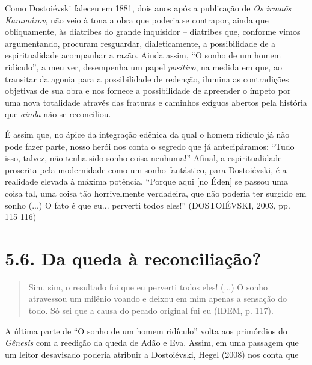 Como Dostoiévski faleceu em 1881, dois anos após a publicação de
\emph{Os irmaõs Karamázov}, não veio à tona a obra que poderia se
contrapor, ainda que obliquamente, às diatribes do grande inquisidor --
diatribes que, conforme vimos argumentando, procuram resguardar,
dialeticamente, a possibilidade de a espiritualidade acompanhar a razão.
Ainda assim, ``O sonho de um homem ridículo'', a meu ver, desempenha um
papel \emph{positivo}, na medida em que, ao transitar da agonia para a
possibilidade de redenção, ilumina as contradições objetivas de sua obra
e nos fornece a possibilidade de apreender o ímpeto por uma nova
totalidade através das fraturas e caminhos exíguos abertos pela história
que \emph{ainda} não se reconciliou.

É assim que, no ápice da integração edênica da qual o homem ridículo já
não pode fazer parte, nosso herói nos conta o segredo que já
antecipáramos: ``Tudo isso, talvez, não tenha sido sonho coisa
nenhuma!'' Afinal, a espiritualidade proscrita pela modernidade como um
sonho fantástico, para Dostoiévski, é a realidade elevada à máxima
potência. ``Porque aqui {[}no Éden{]} se passou uma coisa tal, uma coisa
tão horrivelmente verdadeira, que não poderia ter surgido em sonho (...)
O fato é que eu... perverti todos eles!'' (DOSTOIÉVSKI, 2003, pp.
115-116)

\section{5.6. Da queda à reconciliação?}

\begin{quote}
Sim, sim, o resultado foi que eu perverti todos eles! (...) O sonho
atravessou um milênio voando e deixou em mim apenas a sensação do todo.
Só sei que a causa do pecado original fui eu (IDEM, p. 117).
\end{quote}

A última parte de ``O sonho de um homem ridículo'' volta aos primórdios
do \emph{Gênesis} com a reedição da queda de Adão e Eva. Assim, em uma
passagem que um leitor desavisado poderia atribuir a Dostoiévski, Hegel
(2008) nos conta que

